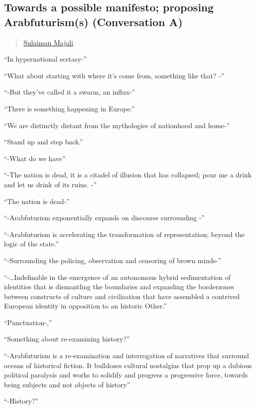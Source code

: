 \subsection{Towards a possible manifesto; proposing Arabfuturism(s)
(Conversation
A)}\label{towards-a-possible-manifesto-proposing-arabfuturisms-conversation-a}

\begin{quote}
\href{../appendix/attributions.html\#sulaiman-majali}{Sulaiman Majali}
\end{quote}

``In hypernational ecstasy-''

``What about starting with where it's come from, something like that?
-''

``-But they've called it a swarm, an influx-''

``There is something happening in Europe.''

``We are distinctly distant from the mythologies of nationhood and
home-''

``Stand up and step back.''

``-What do we have''

``-The nation is dead, it is a citadel of illusion that has collapsed;
pour me a drink and let us drink of its ruins. -''

``The nation is dead-''

``-Arabfuturism exponentially expands on discourse surrounding -''

``-Arabfuturism is accelerating the transformation of representation;
beyond the logic of the state.''

``-Surrounding the policing, observation and censoring of brown minds-''

``-\ldots{}Indefinable in the emergence of an autonomous hybrid
sedimentation of identities that is dismantling the boundaries and
expanding the borderzones between constructs of culture and civilisation
that have assembled a contrived European identity in opposition to an
historic Other.''

``Punctuation-,''

``Something about re-examining history?''

``-Arabfuturism is a re-examination and interrogation of narratives that
surround oceans of historical fiction. It bulldozes cultural nostalgias
that prop up a dubious political paralysis and works to solidify and
progress a progressive force, towards being subjects and not objects of
history''

``-History?''


